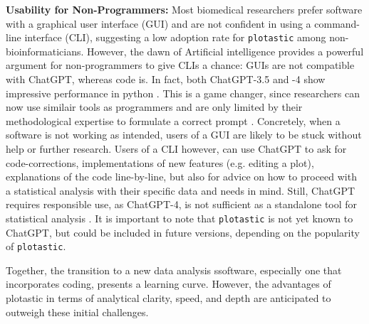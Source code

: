 \textbf{Usability for Non-Programmers:}
Most biomedical researchers prefer software with a graphical user interface
(GUI) and are not confident in using a command-line interface (CLI), suggesting
a low adoption rate for \texttt{plotastic} among non-bioinformaticians. However,
the dawn of Artificial intelligence provides a powerful argument for
non-programmers to give CLIs a chance: GUIs are not compatible with ChatGPT,
whereas code is. In fact, both ChatGPT-3.5 and -4 show impressive performance in
python \cite{arefinUnmaskingGiantComprehensive2023}. This is a game changer,
since researchers can now use similair tools as programmers and are only limited
by their methodological expertise to formulate a correct prompt
\cite{qureshiAreChatGPTLarge2023}. Concretely, when a software is not working
as intended, users of a GUI are likely to be stuck without help or further
research. Users of a CLI however, can use ChatGPT to ask for code-corrections,
implementations of new features (e.g. editing a plot), explanations of the code
line-by-line, but also for advice on how to proceed with a statistical analysis
with their specific data and needs in mind. Still, ChatGPT requires responsible
use, as ChatGPT-4, is not sufficient as a standalone tool for statistical
analysis \cite{ordakChatGPTSkillsStatistical2023}. It is important to note that
\texttt{plotastic} is not yet known to ChatGPT, but could be included in future
versions, depending on the popularity of \texttt{plotastic}.

Together, the transition to a new data analysis ssoftware, especially one
that incorporates coding, presents a learning curve. However, the advantages of
plotastic in terms of analytical clarity, speed, and depth are anticipated to
outweigh these initial challenges.




